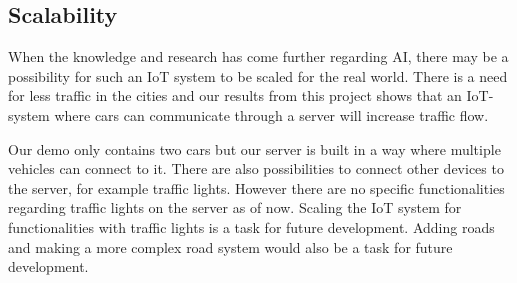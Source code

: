 \subsection{Scalability}
When the knowledge and research has come further regarding AI, there may be a possibility for such an IoT system to be scaled for the real world. There is a need for less traffic in the cities and our results from this project shows that an IoT-system where cars can communicate through a server will increase traffic flow.

Our demo only contains two cars but our server is built in a way where multiple vehicles can connect to it. There are also possibilities to connect other devices to the server, for example traffic lights. However there are no specific functionalities regarding traffic lights on the server as of now. Scaling the IoT system for functionalities with traffic lights is a task for future development. Adding roads and making a more complex road system would also be a task for future development. 
